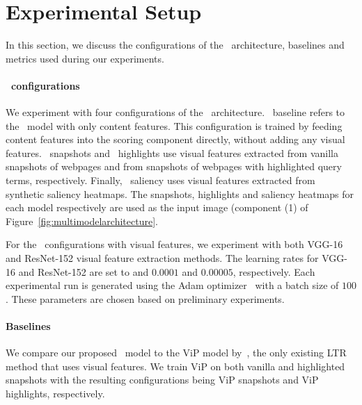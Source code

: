 
\section{Experimental Setup}\label{sec:setup}
In this section, we discuss the configurations of the \modelname~architecture, baselines and metrics used during our experiments.


\paragraph{\modelname~configurations}
We experiment with four configurations of the \modelname~architecture.
\modelname~baseline refers to the \modelname~model with only content features.
This configuration is trained by feeding content features into the scoring component directly, without adding any visual features.
\modelname~snapshots and \modelname~highlights use visual features extracted from vanilla snapshots of webpages and from snapshots of webpages with highlighted query terms, respectively.
Finally, \modelname~saliency uses visual features extracted from synthetic saliency heatmaps. The snapshots, highlights and saliency heatmaps for each model respectively are used as the input image (component (1) of Figure~\ref{fig:multimodelarchitecture}.

For the \modelname~configurations with visual features, we experiment with both VGG-16 and ResNet-152 visual feature extraction methods.
The learning rates for VGG-16 and ResNet-152 are set to and $0.0001$ and $0.00005$, respectively. 
Each experimental run is generated using the Adam optimizer~\cite{kingma2014adam} with a batch size of $100$.
These parameters are chosen based on preliminary experiments.


\paragraph{Baselines}
We compare our proposed \modelname~model to the ViP model by~\citet{fan2017learning}, the only existing \ac{LTR} method that uses visual features.
We train ViP on both vanilla and highlighted snapshots with the resulting configurations being ViP snapshots and ViP highlights, respectively.

